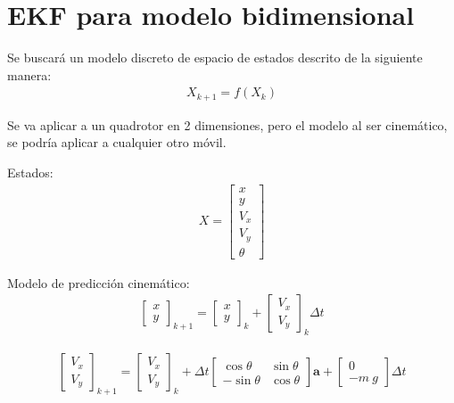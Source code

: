 \section{EKF para modelo bidimensional}
Se buscará un modelo discreto de espacio de estados descrito de la siguiente manera:
\begin{align}
X_{k+1} =  f(X_k)
\end{align}

Se va aplicar a un quadrotor en 2 dimensiones, pero el modelo al ser cinemático, se podría aplicar a cualquier otro móvil.

Estados:
\begin{align}
X = 
\begin{bmatrix} 
x \\ y \\ V_x \\ V_y \\ \theta
\end{bmatrix}
\end{align}

Modelo de predicción cinemático:
\begin{align}
\begin{bmatrix} 
x \\ y 
\end{bmatrix}_{k+1}
=
\begin{bmatrix} 
x \\ y 
\end{bmatrix}_k
+
\begin{bmatrix} 
V_x \\ V_y 
\end{bmatrix}_k
\Delta t
\end{align}

\begin{align}
\begin{bmatrix} 
V_x \\ V_y 
\end{bmatrix}_{k+1}
=
\begin{bmatrix} 
V_x \\ V_y 
\end{bmatrix}_k + 
\Delta t
\begin{bmatrix} 
\cos{\theta} & \sin{\theta} \\ -\sin{\theta} & \cos{\theta}
\end{bmatrix}
\bm{a} +  
\begin{bmatrix} 
0 \\ - m\ g 
\end{bmatrix}\Delta t
\end{align}

